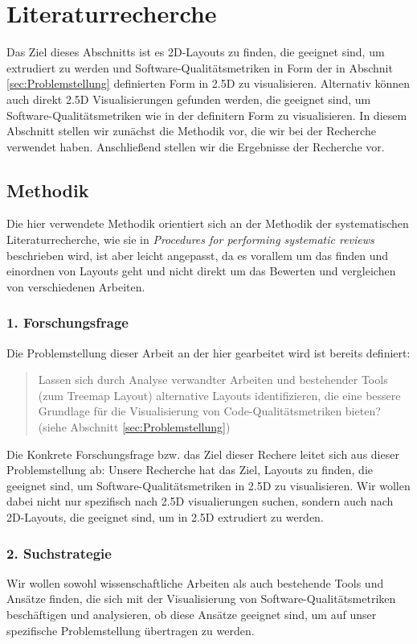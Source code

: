 \section{Literaturrecherche} \label{sec:LiteraturRecherche}
Das Ziel dieses Abschnitts ist es 2D-Layouts zu finden, die geeignet sind, um extrudiert zu werden und Software-Qualitätsmetriken in Form der in Abschnit \ref{sec:Problemstellung} definierten Form in 2.5D zu visualisieren. Alternativ können auch direkt 2.5D Visualisierungen gefunden werden, die geeignet sind, um Software-Qualitätsmetriken wie in der definitern Form zu visualisieren. 
In diesem Abschnitt stellen wir zunächst die Methodik vor, die wir bei der Recherche verwendet haben. Anschließend stellen wir die Ergebnisse der Recherche vor. 

\subsection{Methodik} \label{sec:Methodik}
Die hier verwendete Methodik orientiert sich an der Methodik der systematischen Literaturrecherche, wie sie in \textit{Procedures for performing systematic reviews}\cite{kitchenham2004procedures} beschrieben wird, ist aber leicht angepasst, da es vorallem um das finden und einordnen von Layouts geht und nicht direkt um das Bewerten und vergleichen von verschiedenen Arbeiten.

\subsubsection*{1. Forschungsfrage} \label{sec:Forschungsfrage}
Die Problemstellung dieser Arbeit an der hier gearbeitet wird ist bereits definiert:
\begin{quote}
    Lassen sich durch Analyse verwandter Arbeiten und bestehender Tools (zum Treemap Layout) alternative Layouts identifizieren, die eine bessere Grundlage für die Visualisierung von Code-Qualitätsmetriken bieten? (siehe Abschnitt \ref{sec:Problemstellung})
\end{quote}

Die Konkrete Forschungsfrage bzw. das Ziel dieser Rechere leitet sich aus dieser Problemstellung ab:
Unsere Recherche hat das Ziel, Layouts zu finden, die geeignet sind, um Software-Qualitätsmetriken in 2.5D zu visualisieren. Wir wollen dabei nicht nur spezifisch nach 2.5D visualierungen suchen, sondern auch nach 2D-Layouts, die geeignet sind, um in 2.5D extrudiert zu werden.

\subsubsection*{2. Suchstrategie} \label{sec:Suchstrategie}
Wir wollen sowohl wissenschaftliche Arbeiten als auch bestehende Tools und Ansätze finden, die sich mit der Visualisierung von Software-Qualitätsmetriken beschäftigen und analysieren, ob diese Ansätze geeignet sind, um auf unser spezifische Problemstellung übertragen zu werden.

